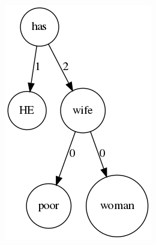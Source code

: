 \documentclass[bigger]{beamer}
\begin{document}
\begin{frame}
\begin{columns}
\begin{column}{0.3\textwidth}
	\pause \includegraphics[scale=0.4]{pics/wifeexp.png}
	\end{column}
\end{columns}
\end{frame}

\end{document}
